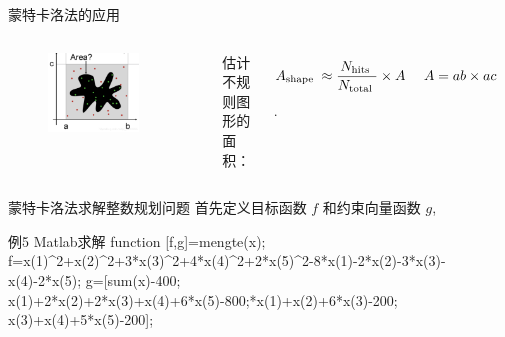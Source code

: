 \documentclass[xcolor=table,dvipsnames,svgnames,aspectratio=169,fontset=ubuntu]{ctexbeamer}
\let\\\relax
\begin{document}
\begin{frame}{蒙特卡洛法的应用}
\begin{columns}
  \begin{figure}
    \centering
    \includegraphics[width=0.8\textwidth]{mc求面积.png}
  \end{figure}
  估计不规则图形的面积：

  \vskip 10pt
  $$\begin{aligned}A_{\text {shape }} &\approx \frac{N_{\text {hits }}}{N_{\text {total }}} \times A\\&~\\ A&=a b \times a c\\\end{aligned}$$.
\end{columns}
\end{frame}

\begin{frame}{蒙特卡洛法求解整数规划问题}
  首先定义目标函数 $f$ 和约束向量函数 $g$,
  \begin{alertblock}{例5 Matlab求解}
    function [f,g]=mengte(x);\\
    f=x(1)\^{}2+x(2)\^{}2+3*x(3)\^{}2+4*x(4)\^{}2+2*x(5)\^{}2-8*x(1)-2*x(2)-3*x(3)-x(4)-2*x(5);\\
    g=[sum(x)-400;\\
    x(1)+2*x(2)+2*x(3)+x(4)+6*x(5)-800;\\
    2*x(1)+x(2)+6*x(3)-200;\\
    x(3)+x(4)+5*x(5)-200];\\
  \end{alertblock}
\end{frame}
\end{document}
